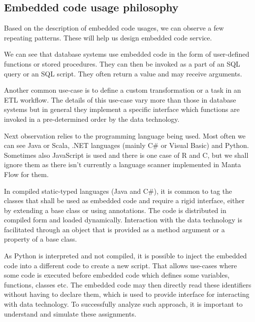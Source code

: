 \subsection{Embedded code usage philosophy}
Based on the description of embedded code usages, we can observe a few repeating patterns. These will help us design embedded code service.
\par
We can see that database systems use embedded code in the form of user-defined functions or stored procedures. They can then be invoked as a part of an SQL query or an SQL script. They often return a value and may receive arguments.
\par
Another common use-case is to define a custom transformation or a task in an ETL workflow. The details of this use-case vary more than those in database systems but in general they implement a specific interface which functions are invoked in a pre-determined order by the data technology.
\par
Next observation relies to the programming language being used. Most often we can see Java or Scala, .NET languages (mainly C\# or Visual Basic) and Python. Sometimes also JavaScript is used and there is one case of R and C, but we shall ignore them as there isn't currently a language scanner implemented in Manta Flow for them.
\par
In compiled static-typed languages (Java and C\#), it is common to tag the classes that shall be used as embedded code and require a rigid interface, either by extending a base class or using annotations. The code is distributed in compiled form and loaded dynamically. Interaction with the data technology is facilitated through an object that is provided as a method argument or a property of a base class.
\par
As Python is interpreted and not compiled, it is possible to inject the embedded code into a different code to create a new script. That allows use-cases where some code is executed before embedded code which defines some variables, functions, classes etc. The embedded code may then directly read these identifiers without having to declare them, which is used to provide interface for interacting with data technology. To successfully analyze such approach, it is important to understand and simulate these assignments.


